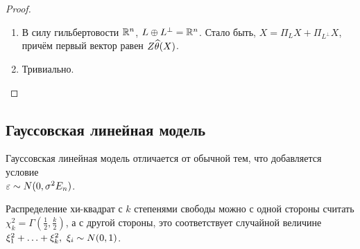 \begin{proof}~
	\begin{enumerate}
		\item В силу гильбертовости $\mathbb{R}^n$, $L \oplus L^\bot = \mathbb{R}^n$. Стало быть, $X = \Pi_L X + \Pi_{L^\bot} X$, причём первый вектор равен $Z\widehat{\theta}(X)$.
		
		\item Тривиально.
	\end{enumerate}
\end{proof}

\subsection{Гауссовская линейная модель}

\begin{note}
	Гауссовская линейная модель отличается от обычной тем, что добавляется условие \\ $\varepsilon \sim N(0, \sigma^2E_n)$.
\end{note}

\begin{reminder}
	Распределение хи-квадрат с $k$ степенями свободы можно с одной стороны считать $\chi_k^2 = \Gamma(\frac{1}{2}, \frac{k}{2})$, а с другой стороны, это соответствует случайной величине $\xi_1^2 + \ldots + \xi_k^2,\ \xi_i \sim N(0, 1)$.
\end{reminder}